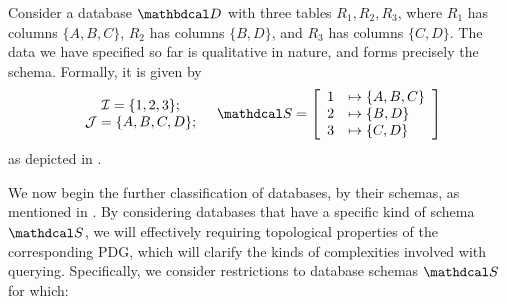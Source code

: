 \documentclass{article}
\theoremstyle{definition}
\theoremstyle{remark}
\newcommand{\D}{\mathbdcal D}
\newcommand{\Attrs}{\mathcal J}
\newcommand{\Idx}{\mathcal I}
\newcommand{\arity}{\mathit{ar}}
\newcommand{\sch}{\mathdcal S}%
\begin{document}
\begin{example}\label{ex:abcd}
	Consider a database $\D$ with three tables $R_1, R_2, R_3$, where $R_1$ has columns $\{A,B,C\}$, $R_2$ has columns $\{B,D\}$, and $R_3$ has columns $\{C,D\}$. The data we have specified so far is qualitative in nature, and forms precisely the schema.
	Formally, it is given by
	\[ 
	\begin{array}{c}
		\Idx = \{1,2,3\};\\
		\Attrs = \{A,B,C,D\};
	\end{array}
	\quad
		\sch = \left[\begin{array}{rl}
				1 &\mapsto \{A, B, C\} \\
				2 &\mapsto \{ B, D \} \\
				3 &\mapsto \{C, D\}
			\end{array}\right]
\] 
	as depicted in .
\end{example}

We now begin the further classification of databases, by their schemas, as mentioned in .  
By considering databases that have a specific kind of schema $\sch$, we will effectively requiring topological properties of the corresponding PDG, which will clarify the kinds of complexities involved with querying. Specifically, we consider restrictions to database schemas $\sch$ for which:
\end{document}
